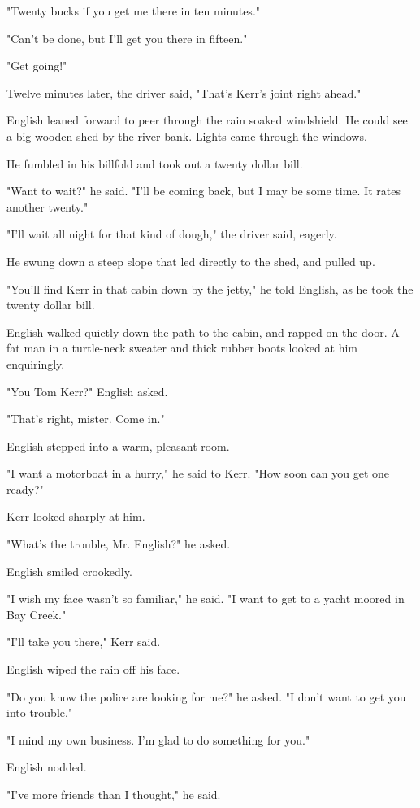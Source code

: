 \documentclass{novel}
\begin{document}
"Twenty bucks if you get me there in ten minutes."

"Can't be done, but I'll get you there in fifteen."

"Get going!"

Twelve minutes later, the driver said, "That's Kerr's joint right ahead."

English leaned forward to peer through the rain soaked windshield. He could see a big wooden shed by the river bank. Lights came through the windows.

He fumbled in his billfold and took out a twenty dollar bill.

"Want to wait?" he said. "I'll be coming back, but I may be some time. It rates another twenty."

"I'll wait all night for that kind of dough," the driver said, eagerly.

He swung down a steep slope that led directly to the shed, and pulled up.

"You'll find Kerr in that cabin down by the jetty," he told English, as he took the twenty dollar bill.

English walked quietly down the path to the cabin, and rapped on the door. A fat man in a turtle-neck sweater and thick rubber boots looked at him enquiringly.

"You Tom Kerr?" English asked.

"That's right, mister. Come in."

English stepped into a warm, pleasant room.

"I want a motorboat in a hurry," he said to Kerr. "How soon can you get one ready?"

Kerr looked sharply at him.

"What's the trouble, Mr. English?" he asked.

English smiled crookedly.

"I wish my face wasn't so familiar," he said. "I want to get to a yacht moored in Bay Creek."

"I'll take you there," Kerr said.

English wiped the rain off his face.

"Do you know the police are looking for me?" he asked. "I don't want to get you into trouble."

"I mind my own business. I'm glad to do something for you."

English nodded.

"I've more friends than I thought," he said.
\end{document}
